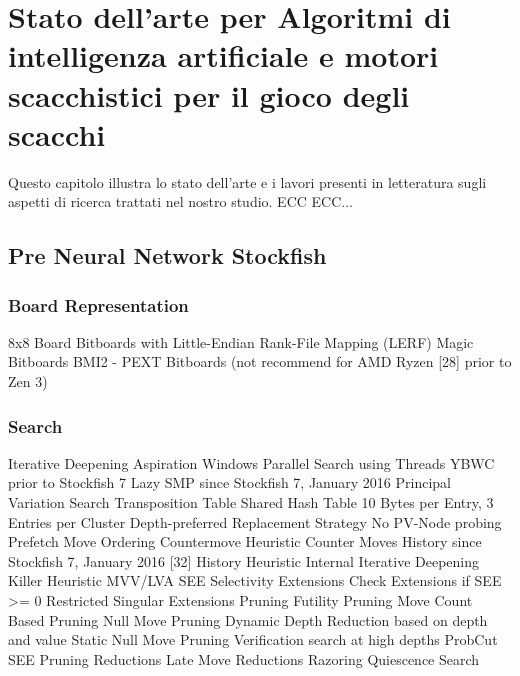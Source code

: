 \chapter{Stato dell'arte per Algoritmi di intelligenza artificiale e motori scacchistici  per il gioco degli scacchi} %
%

\begin{citazione}
Questo capitolo illustra lo stato dell'arte e i lavori presenti in letteratura sugli aspetti di ricerca trattati nel nostro studio. ECC ECC...
\end{citazione}

\newpage



\section{Pre Neural Network Stockfish}

\subsection*{}
\subsection{Board Representation}
8x8 Board
Bitboards with Little-Endian Rank-File Mapping (LERF)
Magic Bitboards
BMI2 - PEXT Bitboards (not recommend for AMD Ryzen [28] prior to Zen 3)

\subsection{Search}
Iterative Deepening
Aspiration Windows
Parallel Search using Threads
YBWC prior to Stockfish 7
Lazy SMP since Stockfish 7, January 2016
Principal Variation Search
Transposition Table
Shared Hash Table
10 Bytes per Entry, 3 Entries per Cluster
Depth-preferred Replacement Strategy
No PV-Node probing
Prefetch
Move Ordering
Countermove Heuristic
Counter Moves History since Stockfish 7, January 2016 [32]
History Heuristic
Internal Iterative Deepening
Killer Heuristic
MVV/LVA
SEE
Selectivity
Extensions
Check Extensions if SEE >= 0
Restricted Singular Extensions
Pruning
Futility Pruning
Move Count Based Pruning
Null Move Pruning
Dynamic Depth Reduction based on depth and value
Static Null Move Pruning
Verification search at high depths
ProbCut
SEE Pruning
Reductions
Late Move Reductions
Razoring
Quiescence Search


